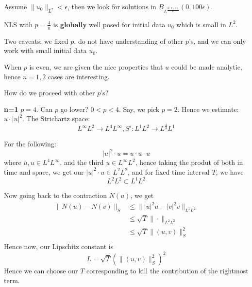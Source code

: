 Assume $\|u_0\|_{L^2}<\epsilon$, then we look for solutions in $B_{L^\frac{2(n+1)}{n}}(0,100\epsilon)$.

\begin{theorem}
    NLS with $p=\frac{4}{n}$ is \textbf{globally} well posed for initial data $u_0$ which is small in $L^2$. 
\end{theorem}
\begin{note}
    Two caveats: we fixed $p$, do not have understanding of other $p$'s, and we can only work with small initial data $u_0$.
\end{note}
\begin{remark}
    When $p$ is even, we are given the nice properties that $u$ could be made analytic, hence $n=1, 2$ cases are interesting.
\end{remark}
\begin{problem}
    How do we proceed with other $p$'s?
\end{problem}

\textbf{n=1} $p=4$. Can $p$ go lower? $0<p<4$. Say, we pick $p=2$. Hence we estimate: $u\cdot|u|^2$. The Strichartz space:
\begin{equation*}
    L^\infty L^2\to L^4L^\infty, S': L^1L^2\to L^\frac{4}{3}L^1
\end{equation*}

For the following:
\begin{equation*}
    |u|^2\cdot u=\overline{u}\cdot u\cdot u
\end{equation*}
where $\overline{u}, u\in L^4L^\infty$, and the third $u\in L^\infty L^2$, hence taking the produt of both in time and space, we get our $|u|^2\cdot u\in L^2L^2$, and for fixed time interval $T$, we have
\begin{equation*}
    L^2L^2\subset L^1L^2
\end{equation*}

Now going back to the contraction $N(u)$, we get 
\begin{align*}
    \|N(u)-N(v)\|_S&\leq\||u|^2u-|v|^2v\|_{L^1L^2}\\
    &\leq\sqrt{T}\|\cdot\|_{L^2L^2}\\
    &\leq \sqrt{T}\|(u,v)\|_S^2\\
\end{align*}
Hence now, our Lipschitz constant is
\begin{equation*}
    L=\sqrt{T}\left(\|(u,v)\|_S^2 \right)^2
\end{equation*}
Hence we can choose our $T$ corresponding to kill the contribution of the rightmost term.

